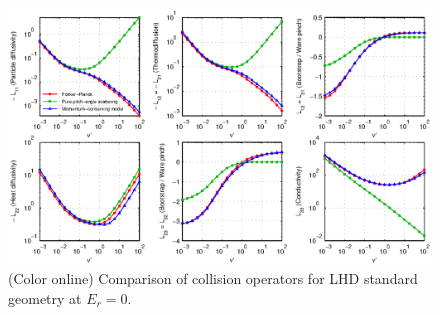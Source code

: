 \documentclass[12pt]{revtex4}
\begin{document}
\begin{figure}[h!]
\includegraphics{m20131208_01_plotSFINCSFortranAndMatlabNuScansForPaper_LHD.eps}
\caption{(Color online) Comparison of collision operators for LHD standard geometry at $E_r=0$.
\label{fig:collisionComparison_LHD}}
\end{figure}
\end{document}
